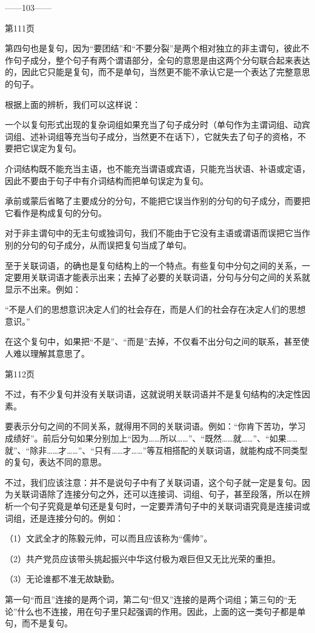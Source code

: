 ——103——

第111页

第四句也是复句，因为“要团结”和“不要分裂”是两个相对独立的非主谓句，彼此不作句子成分，整个句子有两个谓语部分，全句的意思是由这两个分句联合起来表达的，因此它只能是复句，而不是单句，当然更不能不承认它是一个表达了完整意思的句子。

根据上面的辨析，我们可以这样说：

一个以复句形式出现的复杂词组如果充当了句子成分时（单句作为主谓词组、动宾词组、述补词组等充当句子成分，当然更不在话下），它就失去了句子的资格，不要把它误定为复句。

介词结构既不能充当主语，也不能充当谓语或宾语，只能充当状语、补语或定语，因此不要由于句子中有介词结构而把单句误定为复句。

承前或蒙后省略了主要成分的分句，不能把它误当作别的分句的句子成分，而要把它看作是构成复句的分句。

对于非主谓句中的无主句或独词句，我们不能由于它没有主语或谓语而误把它当作别的分句的句子成分，从而误把复句当成了单句。

至于关联词语，的确也是复句结构上的一个特点。有些复句中分句之间的关系，一定要用关联词语才能表示出来；去掉了必要的关联词语，分句与分句之间的关系就显示不出来。例如：

“不是人们的思想意识决定人们的社会存在，而是人们的社会存在决定人们的思想意识。”

在这个复句中，如果把“不是”、“而是”去掉，不仅看不出分句之间的联系，甚至使人难以理解其意思了。

第112页

不过，有不少复句并没有关联词语，这就说明关联词语并不是复句结构的决定性因素。

要表示分句之间的不同关系，就得用不同的关联词语。例如：“你肯下苦功，学习成绩好”。前后分句如果分别加上“因为……所以……”、“既然……就……”、“如果……就”、“除非……才……”、“只有……才……”等互相搭配的关联词语，就能构成不同类型的复句，表达不同的意思。

不过，我们应该注意：并不是说句子中有了关联词语，这个句子就一定是复句。因为关联词语除了连接分句之外，还可以连接词、词组、句子，甚至段落，所以在辨析一个句子究竟是单句还是复句时，一定要弄清句子中的关联词语究竟是连接词或词组，还是连接分句的。例如：

（1）文武全才的陈毅元帅，可以而且应该称为“儒帅”。

（2）共产党员应该带头挑起振兴中华这付极为艰巨但又无比光荣的重担。

（3）无论谁都不准无故缺勤。

第一句“而且”连接的是两个词，第二句“但又”连接的是两个词组；第三句的“无论”什么也不连接，用在句子里只起强调的作用。因此，上面的这一类句子都是单句，而不是复句。

